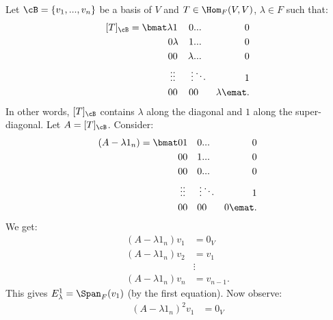     \begin{example}
        Let $\cB = \{v_1,...,v_n\}$ be a basis of $V$ and $T \in \Hom_F{(V,V)}$, $\lambda \in F$ such that:
            \begin{equation*}
            \begin{split}
                [T]_\cB = 
                \bmat
                \lambda & 1 & 0 & ... & 0 \\
                0 & \lambda  & 1 & ... & 0 \\
                0 & 0 & \lambda & ... & 0 \\
                \vdots & \vdots & \vdots & \ddots & 1 \\
                0 & 0 & 0 & 0 & \lambda
                \emat.
            \end{split}
            \end{equation*}
        In other words, $[T]_\cB$ contains $\lambda$ along the diagonal and $1$ along the super-diagonal. Let $A = [T]_\cB$. Consider:
            \begin{equation*}
            \begin{split}
                (A-\lambda 1_n) =
                \bmat
                0 & 1 & 0 & ... & 0 \\
                0 & 0  & 1 & ... & 0 \\
                0 & 0 & 0 & ... & 0 \\
                \vdots & \vdots & \vdots & \ddots & 1 \\
                0 & 0 & 0 & 0 & 0
                \emat.
            \end{split}
            \end{equation*}
        We get:
            \begin{equation*}
            \begin{split}
                (A - \lambda 1_n)v_1 &= 0_V \\
                (A - \lambda 1_n)v_2 &= v_1 \\
                &\vdots \\
                (A - \lambda 1_n)v_n &= v_{n-1}.
            \end{split}
            \end{equation*}
        This gives $E_\lambda^1 = \Span_F{(v_1)}$ (by the first equation). Now observe:
            \begin{equation*}
            \begin{split}
                (A - \lambda 1_n)^2 v_1 &= 0_V \\

\end{split}
\end{equation*}
\end{example}
